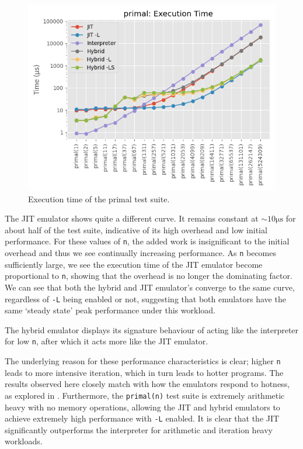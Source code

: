 \begin{figure}[H]
    \centering
    \includegraphics[scale=0.75]{output/graphs/tests/all/primal/time.png}
    \caption{Execution time of the primal test suite.}
    \label{figure:primal-time}
\end{figure}

The JIT emulator shows quite a different curve. It remains constant at $\sim10\si{\micro\second}$ for about half of the test suite, indicative of its high overhead and low initial performance. For these values of \texttt{n}, the added work is insignificant to the initial overhead and thus we see continually increasing performance. As \texttt{n} becomes sufficiently large, we see the execution time of the JIT emulator become proportional to \texttt{n}, showing that the overhead is no longer the dominating factor. We can see that both the hybrid and JIT emulator's converge to the same curve, regardless of \texttt{-L} being enabled or not, suggesting that both emulators have the same `steady state' peak performance under this workload.

The hybrid emulator displays its signature behaviour of acting like the interpreter for low \texttt{n}, after which it acts more like the JIT emulator.

The underlying reason for these performance characteristics is clear; higher \texttt{n} leads to more intensive iteration, which in turn leads to hotter programs. The results observed here closely match with how the emulators respond to hotness, as explored in . Furthermore, the \texttt{primal(n)} test suite is extremely arithmetic heavy with no memory operations, allowing the JIT and hybrid emulators to achieve extremely high performance with \texttt{-L} enabled. It is clear that the JIT significantly outperforms the interpreter for arithmetic and iteration heavy workloads.


